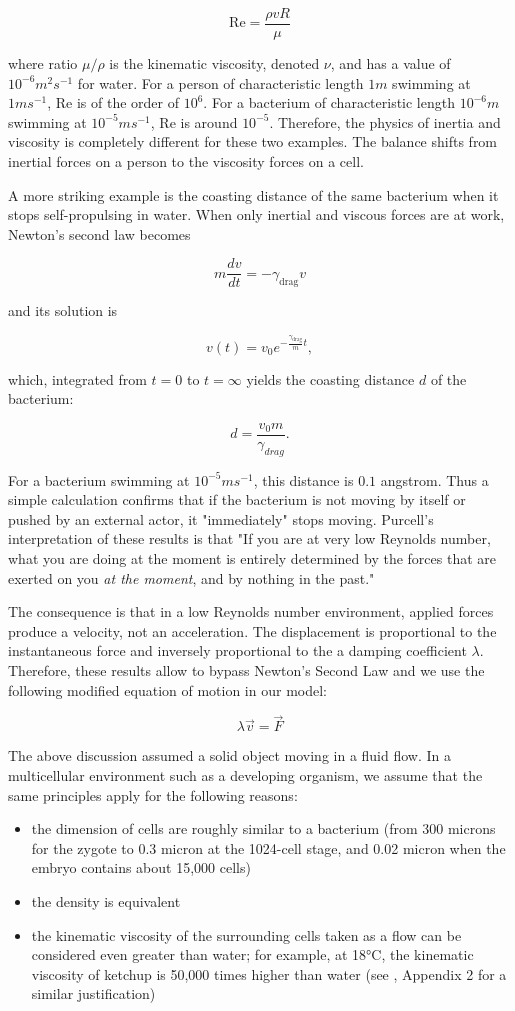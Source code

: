 $$\mathrm{Re} = \frac{\rho v R}{\mu}$$

where ratio $\mu/\rho$ is the kinematic viscosity, denoted $\nu$, and has a value of $10^{-6} {m}^2 {s}^{-1}$ for water. For a person of characteristic length $1m$ swimming at $1 m s^{-1}$, $\mathrm{Re}$ is of the order of $10^6$. For a bacterium of characteristic length $10^{-6} m$ swimming at $10^{-5} m s^{-1}$, $\mathrm{Re}$ is around $10^{-5}$. Therefore, the physics of inertia and viscosity is completely different for these two examples. The balance shifts from inertial forces on a person to the viscosity forces on a cell.

A more striking example is the coasting distance of the same bacterium when it stops self-propulsing in water. When only inertial and viscous forces are at work, Newton's second law becomes

$$ m \frac{dv}{dt} = - \gamma_{\mathrm{drag}} v$$

and its solution is \cite{Claycomb:2010wk}

$$ v(t) = v_0 e^{ -\frac{\gamma_{\mathrm{drag}}}{m} t}, $$

which, integrated from $t=0$ to $t=\infty$ yields the coasting distance $d$ of the bacterium:

$$d = \frac{v_0 m}{\gamma_{drag}}.$$

For a bacterium swimming at $10^{-5} m s^{-1}$, this distance is $0.1$ angstrom. Thus a simple calculation confirms that if the bacterium is not moving by itself or pushed by an external actor, it "immediately" stops moving. Purcell's interpretation of these results is that "If you are at very low Reynolds number, what you are doing at the moment is entirely determined by the forces that are exerted on you \textit{at the moment}, and by nothing in the past."

The consequence is that in a low Reynolds number environment, applied forces produce a velocity, not an acceleration. The displacement is proportional to the instantaneous force and inversely proportional to the a damping coefficient $\lambda$. Therefore, these results allow to bypass Newton's Second Law and we use the following modified equation of motion in our model:

$$\lambda \vec{v} = \vec{F}$$

The above discussion assumed a solid object moving in a fluid flow. In a multicellular environment such as a developing organism, we assume that the same principles apply for the following reasons:
\begin{itemize}
	\item the dimension of cells are roughly similar to a bacterium (from 300 microns for the zygote to 0.3 micron at the 1024-cell stage, and 0.02 micron when the embryo contains about 15,000 cells)
	\item the density is equivalent
	\item the kinematic viscosity of the surrounding cells taken as a flow can be considered even greater than water; for example, at 18°C, the kinematic viscosity of ketchup is 50,000 times higher than water (see \cite{Odell:1981vy}, Appendix 2 for a similar justification)
\end{itemize}


